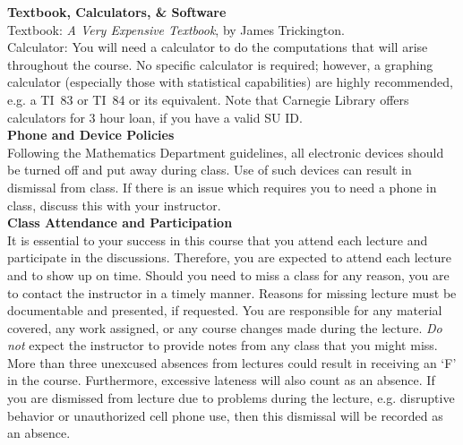 \documentclass[11pt,letterpaper]{article}
\newcommand{\lefthead}[2]{\noindent\textbf{#1}\hfill\\[#2]}
\begin{document}
\lefthead{Textbook, Calculators, \& Software}{0.3cm}
\noindent Textbook: \emph{A Very Expensive Textbook}, by James Trickington. \\

\noindent Calculator: You will need a calculator to do the computations that will arise throughout the course. No specific calculator is required; however, a graphing calculator (especially those with statistical capabilities) are highly recommended, e.g. a TI~83 or TI~84 or its equivalent. Note that Carnegie Library offers calculators for 3 hour loan, if you have a valid SU ID. \\[0.3cm]





\lefthead{Phone and Device Policies}{0.3cm}
\noindent Following the Mathematics Department guidelines, all electronic devices should be turned off and put away during class. Use of such devices can result in dismissal from class. If there is an issue which requires you to need a phone in class, discuss this with your instructor. \\[0.3cm]





\lefthead{Class Attendance and Participation}{0.3cm}
 It is essential to your success in this course that you attend each lecture and participate in the discussions. Therefore, you are expected to attend each lecture and to show up on time. Should you need to miss a class for any reason, you are to contact the instructor in a timely manner. Reasons for missing lecture must be documentable and presented, if requested. You are responsible for any material covered, any work assigned, or any course changes made during the lecture. \emph{Do not} expect the instructor to provide notes from any class that you might miss. More than three unexcused absences from lectures could result in receiving an `F' in the course. Furthermore, excessive lateness will also count as an absence. If you are dismissed from lecture due to problems during the lecture, e.g. disruptive behavior or unauthorized cell phone use, then this dismissal will be recorded as an absence. \\
\end{document}
